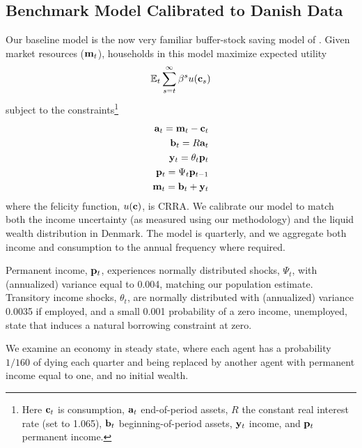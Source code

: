 \documentclass[titlepage]{\econtex}\newcommand{\texname}{ConsumptionHeterogeneity}
\begin{document}
\subsection{Benchmark Model Calibrated to Danish Data} \label{benchmark_model}
Our baseline model is the now very familiar buffer-stock saving model of \cite{carroll_buffer_1997}. Given market resources ($\boldmath{\ensuremath{\mathbf{m}}}_t$), households in this model maximize expected utility
\begin{align*}
	\mathbb{E}_t \sum_{s=t}^{\infty} \beta^s u(\mathbf{c}_s)
\end{align*}
subject to the constraints\footnote{Here $\mathbf{c}_t$ is consumption, $\mathbf{a}_t$ end-of-period assets, $R$ the constant real interest rate (set to 1.065), $\mathbf{b}_t$ beginning-of-period assets, $\mathbf{y}_t$ income, and $\mathbf{p}_t$ permanent income.}
\begin{align*}
	\mathbf{a}_t = \mathbf{m}_t - \mathbf{c}_t \\
	\mathbf{b}_t = R\mathbf{a}_t \\
	\mathbf{y}_t = \theta_t \mathbf{p}_t \\
	\mathbf{p}_t = \Psi_t \mathbf{p}_{t-1} \\
	\mathbf{m}_t = \mathbf{b}_t + \mathbf{y}_t
\end{align*}
where the felicity function, $u(\mathbf{c})$, is CRRA. We calibrate our model to match both the income uncertainty (as measured using our methodology) and the liquid wealth distribution in Denmark. The model is quarterly, and we aggregate both income and consumption to the annual frequency where required.

Permanent income, $\mathbf{p}_t$, experiences normally distributed shocks, $\Psi_t$, with (annualized) variance equal to 0.004, matching our population estimate. Transitory income shocks, $\theta_t$, are normally distributed with (annualized) variance 0.0035 if employed, and a small 0.001 probability of a zero income, unemployed, state that induces a natural borrowing constraint at zero.

We examine an economy in steady state, where each agent has a probability $1/160$ of dying each quarter and being replaced by another agent with permanent income equal to one, and no initial wealth.
\end{document}
